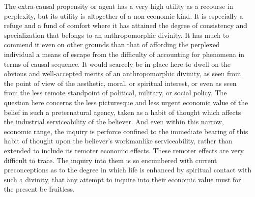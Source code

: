 \documentclass[12pt]{report}
\begin{document}
The extra-causal propensity or agent has a very high utility as a
recourse in perplexity, but its utility is altogether of a non-economic
kind. It is especially a refuge and a fund of comfort where it has
attained the degree of consistency and specialization that belongs to
an anthropomorphic divinity. It has much to commend it even on other
grounds than that of affording the perplexed individual a means of
escape from the difficulty of accounting for phenomena in terms of
causal sequence. It would scarcely be in place here to dwell on the
obvious and well-accepted merits of an anthropomorphic divinity, as seen
from the point of view of the aesthetic, moral, or spiritual interest,
or even as seen from the less remote standpoint of political, military,
or social policy. The question here concerns the less picturesque and
less urgent economic value of the belief in such a preternatural agency,
taken as a habit of thought which affects the industrial serviceability
of the believer. And even within this narrow, economic range, the
inquiry is perforce confined to the immediate bearing of this habit
of thought upon the believer's workmanlike serviceability, rather than
extended to include its remoter economic effects. These remoter effects
are very difficult to trace. The inquiry into them is so encumbered with
current preconceptions as to the degree in which life is enhanced by
spiritual contact with such a divinity, that any attempt to inquire into
their economic value must for the present be fruitless.
\end{document}
